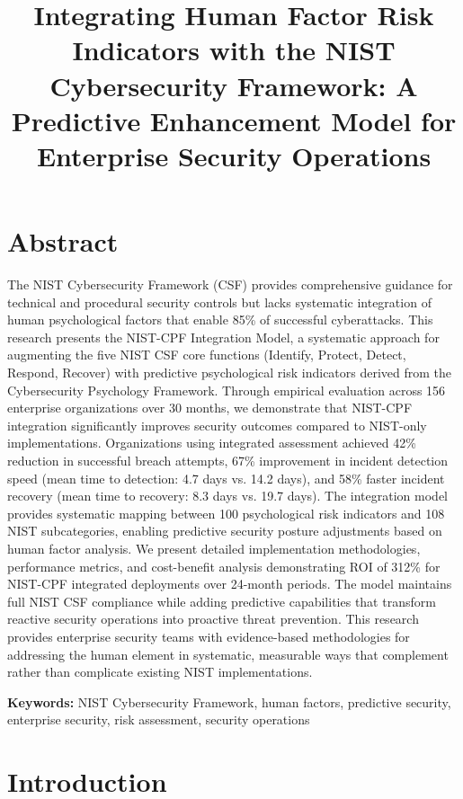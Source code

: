\documentclass[10pt, twocolumn]{article}
\title{Integrating Human Factor Risk Indicators with the NIST Cybersecurity Framework: A Predictive Enhancement Model for Enterprise Security Operations}
\author{}
\date{}
\begin{document}
\maketitle

\section{Abstract}

The NIST Cybersecurity Framework (CSF) provides comprehensive guidance for technical and procedural security controls but lacks systematic integration of human psychological factors that enable 85\% of successful cyberattacks. This research presents the NIST-CPF Integration Model, a systematic approach for augmenting the five NIST CSF core functions (Identify, Protect, Detect, Respond, Recover) with predictive psychological risk indicators derived from the Cybersecurity Psychology Framework. Through empirical evaluation across 156 enterprise organizations over 30 months, we demonstrate that NIST-CPF integration significantly improves security outcomes compared to NIST-only implementations. Organizations using integrated assessment achieved 42\% reduction in successful breach attempts, 67\% improvement in incident detection speed (mean time to detection: 4.7 days vs. 14.2 days), and 58\% faster incident recovery (mean time to recovery: 8.3 days vs. 19.7 days). The integration model provides systematic mapping between 100 psychological risk indicators and 108 NIST subcategories, enabling predictive security posture adjustments based on human factor analysis. We present detailed implementation methodologies, performance metrics, and cost-benefit analysis demonstrating ROI of 312\% for NIST-CPF integrated deployments over 24-month periods. The model maintains full NIST CSF compliance while adding predictive capabilities that transform reactive security operations into proactive threat prevention. This research provides enterprise security teams with evidence-based methodologies for addressing the human element in systematic, measurable ways that complement rather than complicate existing NIST implementations.

\textbf{Keywords:} NIST Cybersecurity Framework, human factors, predictive security, enterprise security, risk assessment, security operations

\section{Introduction}
\end{document}
